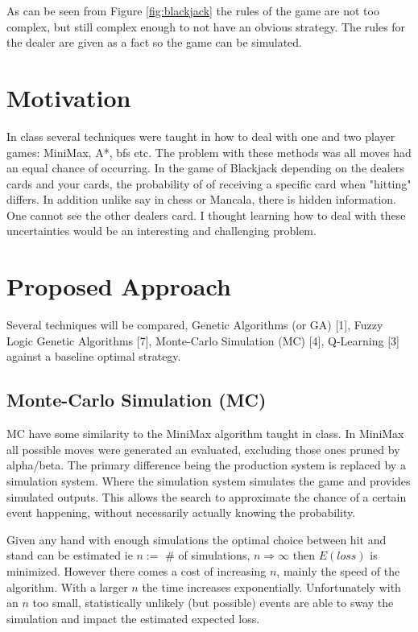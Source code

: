 \documentclass[10pt, a4paper, twocolumn]{article}
\begin{document}
As can be seen from Figure \ref{fig:blackjack} the rules of the game are not too complex, but still complex enough to not have an obvious strategy. The rules for the dealer are given as a fact so the game can be simulated. 

\section{Motivation}

In class several techniques were taught in how to deal with one and two player games: MiniMax, A*, bfs etc. The problem with these methods was all moves had an equal chance of occurring. In the game of Blackjack depending on the dealers cards and your cards, the probability of of receiving a specific card when "hitting" differs. In addition unlike say in chess or Mancala, there is hidden information. One cannot see the other dealers card. I thought learning how to deal with these uncertainties would be an interesting and challenging problem. 

\section{Proposed Approach}

Several techniques will be compared, Genetic Algorithms (or GA) [1], Fuzzy Logic Genetic Algorithms [7], Monte-Carlo Simulation (MC) [4], Q-Learning [3] against a baseline optimal strategy. 

\subsection{Monte-Carlo Simulation (MC)}

MC have some similarity to the MiniMax algorithm taught in class. In MiniMax all possible moves were generated an evaluated, excluding those ones pruned by alpha/beta. The primary difference being the production system is replaced by a simulation system. Where the simulation system simulates the game and provides simulated outputs. This allows the search to approximate the chance of a certain event happening, without necessarily actually knowing the probability. 

Given any hand with enough simulations the optimal choice between hit and stand can be estimated ie $n := $ \# of simulations, $n \Rightarrow \infty$ then $E(loss)$ is minimized. However there comes a cost of increasing $n$, mainly the speed of the algorithm. With a larger $n$ the time increases exponentially. Unfortunately with an $n$ too small, statistically unlikely (but possible) events are able to sway the simulation and impact the estimated expected loss.
\end{document}
